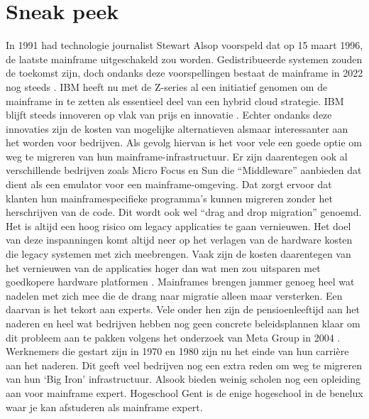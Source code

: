 
\section{Sneak peek}
\label{sec:state-of-the-art}
In 1991 had technologie journalist Stewart Alsop voorspeld dat op 15 maart 1996, de laatste mainframe uitgeschakeld zou worden. Gedistribueerde systemen zouden de toekomst zijn, doch ondanks deze voorspellingen bestaat de mainframe in 2022 nog steeds \autocite{Barnett2005}. IBM heeft nu met de Z-series al een initiatief genomen om de mainframe in te zetten als essentieel deel van een hybrid cloud strategie. IBM blijft steeds innoveren op vlak van prijs en innovatie \autocite{Smolaks2021}. Echter ondanks deze innovaties zijn de kosten van mogelijke alternatieven alsmaar interessanter aan het worden voor bedrijven. Als gevolg hiervan is het voor vele een goede optie om weg te migreren van hun mainframe-infrastructuur. Er zijn daarentegen ook al verschillende bedrijven zoals Micro Focus en Sun die “Middleware” aanbieden dat dient als een emulator voor een mainframe-omgeving. Dat zorgt ervoor dat klanten hun mainframespecifieke programma’s kunnen migreren zonder het herschrijven van de code. Dit wordt ook wel “drag and drop migration” genoemd. Het is altijd een hoog risico om legacy applicaties te gaan vernieuwen. Het doel van deze inspanningen komt altijd neer op het verlagen van de hardware kosten die legacy systemen met zich meebrengen. Vaak zijn de kosten daarentegen van het vernieuwen van de applicaties hoger dan wat men zou uitsparen met goedkopere hardware platformen \autocite{Bingell2014}. Mainframes brengen jammer genoeg heel wat nadelen met zich mee die de drang naar migratie alleen maar versterken. Een daarvan is het tekort aan experts. Vele onder hen zijn de pensioenleeftijd aan het naderen en heel wat bedrijven hebben nog geen concrete beleidsplannen klaar om dit probleem aan te pakken volgens het onderzoek van Meta Group in 2004 \autocite{Bakker2006}. Werknemers die gestart zijn in 1970 en 1980 zijn nu het einde van hun carrière aan het naderen. Dit geeft veel bedrijven nog een extra reden om weg te migreren van hun ‘Big Iron’ infrastructuur. Alsook bieden weinig scholen nog een opleiding aan voor mainframe expert. Hogeschool Gent is de enige hogeschool in de benelux waar je kan afstuderen als mainframe expert. 

 

